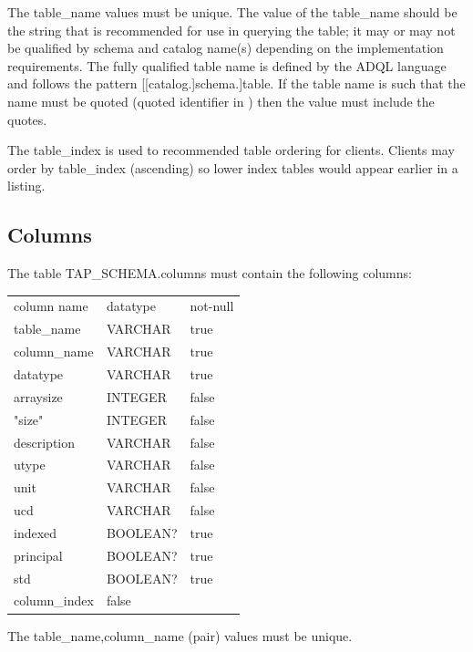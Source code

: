 \documentclass[11pt,letter]{ivoa}
\begin{document}
The table\_name values must be unique. The value of the 
table\_name should be the string that is recommended for use in 
querying the table; it may or may not be qualified by schema and catalog name(s) 
depending on the implementation requirements. The fully qualified table name is 
defined by the ADQL language and follows the pattern [[catalog.]schema.]table. 
If the table name is such that the name must be quoted (quoted identifier in 
\citep{std:ADQL}) then the value must include the quotes.

The table\_index is used to recommended table ordering for clients. Clients 
may order by table\_index (ascending) so lower index tables would appear 
earlier in a listing.

\subsection{Columns}
\label{sec:tap-schema-columns}
The table TAP\_SCHEMA.columns must contain the following columns:

\begin{tabular}{l l l}
\label{tab:tap-schema-columns}
column name & datatype & not-null \\
table\_name & VARCHAR & true \\
column\_name & VARCHAR & true \\
datatype & VARCHAR & true \\
arraysize & INTEGER & false \\
"size" & INTEGER & false \\
description & VARCHAR & false \\
utype & VARCHAR & false \\
unit & VARCHAR & false \\
ucd & VARCHAR & false \\
indexed & BOOLEAN? & true \\
principal & BOOLEAN? & true \\
std & BOOLEAN? & true \\
column\_index & false \\
\end{tabular}

The table\_name,column\_name (pair) values must be 
unique.
\end{document}
